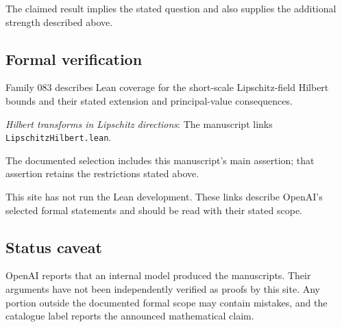 \documentclass[11pt]{article}
\begin{document}
The claimed result implies the stated question and also supplies the additional strength described above.

\subsection{Formal verification}
Family 083 describes Lean coverage for the short-scale Lipschitz-field Hilbert bounds and their stated extension and principal-value consequences.

\textit{Hilbert transforms in Lipschitz directions}: The manuscript links \texttt{LipschitzHilbert.lean}.

The documented selection includes this manuscript’s main assertion; that assertion retains the restrictions stated above.

This site has not run the Lean development. These links describe OpenAI’s selected formal statements and should be read with their stated scope.

\subsection{Status caveat}
OpenAI reports that an internal model produced the manuscripts. Their arguments have not been independently verified as proofs by this site. Any portion outside the documented formal scope may contain mistakes, and the catalogue label reports the announced mathematical claim.
\end{document}
